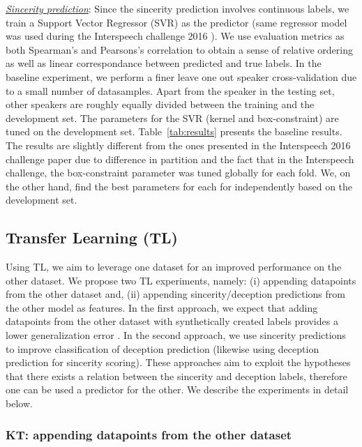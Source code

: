 \documentclass{article}
\begin{document}
\noindent\underline{\it Sincerity prediction}:
Since the sincerity prediction involves continuous labels, we train a Support Vector Regressor (SVR) as the predictor (same regressor model was used during the Interspeech challenge 2016 \cite{schuller2016interspeech}).
We use evaluation metrics as both Spearman's and Pearsons's correlation to obtain a sense of relative ordering as well as linear correspondance between predicted and true labels. 
In the baseline experiment, we perform a finer leave one out speaker cross-validation due to a small number of datasamples.
Apart from the speaker in the testing set, other speakers are roughly equally divided between the training and the development set.
The parameters for the SVR (kernel and box-constraint) are tuned on the development set. 
Table~\ref{tab:results} presents the baseline results.
The results are slightly different from the ones presented in the Interspeech 2016 challenge paper \cite{schuller2016interspeech} due to difference in partition and the fact that in the Interspeech challenge, the box-constraint parameter was tuned globally for each fold.
We, on the other hand, find the best parameters for each for independently based on the development set. 

\subsection{Transfer Learning (TL)}
Using TL, we aim to leverage one dataset for an improved performance on the other dataset.
We propose two TL experiments, namely: (i) appending datapoints from the other dataset and, (ii) appending sincerity/deception predictions from the other model as features.
In the first approach, we expect that adding datapoints from the other dataset with synthetically created labels provides a lower generalization error \cite{vapnik1998statistical}.
In the second approach, we use sincerity predictions to improve classification of deception prediction (likewise using deception prediction for sincerity scoring). 
These approaches aim to exploit the hypotheses that there exists a relation between the sincerity and deception labels, therefore one can be used a predictor for the other.
We describe the experiments in detail below. 

\subsubsection{KT: appending datapoints from the other dataset}
\end{document}
